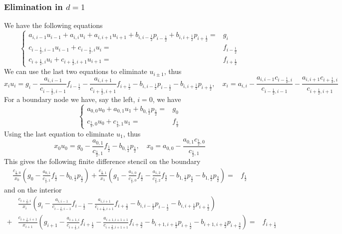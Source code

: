 \documentclass[12pt, english]{article}
\begin{document}
\subsubsection{Elimination in $d=1$}
%
We have the following equations
%
\begin{equation}\label{eq:}
%
\left\{
\begin{aligned}
a_{i,i-1} u_{i-1} + a_{i,i} u_{i} + a_{i,i+1} u_{i+1} + b_{i,i-\frac12} p_{i-\frac12}   + b_{i,i+\frac12} p_{i+\frac12} =& g_i\\
c_{i-\frac12, i-1} u_{i-1} + c_{i-\frac12, i} u_{i} =& f_{i-\frac12}\\
c_{i+\frac12, i} u_{i} + c_{i+\frac12, i+1} u_{i+1} =& f_{i+\frac12}
\end{aligned}
\right.
%
\end{equation}
%
We can use the last two equations to eliminate $u_{i\pm1}$, thus
%
\begin{equation}\label{eq:}
x_i u_i =  g_i - \frac{a_{i,i-1}}{c_{i-\frac12, i-1}}f_{i-\frac12}- \frac{a_{i,i+1}}{c_{i+\frac12, i+1}}f_{i+\frac12}
- b_{i,i-\frac12} p_{i-\frac12}   - b_{i,i+\frac12} p_{i+\frac12},\quad
x_i = a_{i,i} - \frac{a_{i,i-1}c_{i-\frac12, i}}{c_{i-\frac12, i-1}}- \frac{a_{i,i+1}c_{i+\frac12, i}}{c_{i+\frac12, i+1}}
\end{equation}
%
For a boundary node we have, say the left, $i=0$, we have
\begin{equation}\label{eq:}
%
\left\{
\begin{aligned}
a_{0,0} u_{0} + a_{0,1} u_{1} + b_{0,\frac12} p_{\frac12} =& g_0\\
c_{\frac12, 0} u_{0} + c_{\frac12, 1} u_{1} =& f_{\frac12}
\end{aligned}
\right.
%
\end{equation}
%
Using the last  equation to eliminate $u_{1}$, thus
%
\begin{equation}\label{eq:}
x_0 u_0 =  g_0 - \frac{a_{0,1}}{c_{\frac12, 1}}f_{\frac12}
  - b_{0,\frac12} p_{\frac12},\quad
x_0 = a_{0,0} -  \frac{a_{0,1}c_{\frac12, 0}}{c_{\frac12, 1}}
\end{equation}
%
This gives the following finite difference stencil on the boundary
%
%
\begin{align*}
\frac{c_{\frac12, 0}}{x_{0}} \left(g_0 - \frac{a_{0,1}}{c_{\frac12, 1}}f_{\frac12}
  - b_{0,\frac12} p_{\frac12}\right) 
  + \frac{c_{\frac12, 1}}{x_1} \left(
  g_1 - \frac{a_{1,0}}{c_{\frac12, 0}}f_{\frac12}- \frac{a_{1,2}}{c_{\frac32, 2}}f_{\frac32}
- b_{1,\frac12} p_{\frac12}   - b_{1,\frac32} p_{\frac32}
\right) =& f_{\frac12}
\end{align*}
%
and on the interior
%
\begin{align*}
&\frac{c_{i+\frac12, i}}{x_i} \left( 
g_i - \frac{a_{i,i-1}}{c_{i-\frac12, i-1}}f_{i-\frac12}- \frac{a_{i,i+1}}{c_{i+\frac12, i+1}}f_{i+\frac12}
- b_{i,i-\frac12} p_{i-\frac12}   - b_{i,i+\frac12} p_{i+\frac12}
\right)  
\\+& \frac{c_{i+\frac12, i+1}}{x_{i+1}} \left( 
g_{i+1} - \frac{a_{i+1,i}}{c_{i+\frac12, i}}f_{i+\frac12}- \frac{a_{i+1,i+1+1}}{c_{i+\frac32, i+1+1}}f_{i+\frac32}
- b_{i+1,i+\frac12} p_{i+\frac12}   - b_{i+1,i+\frac32} p_{i+\frac32}
\right) =& f_{i+\frac12}
\end{align*}
%
\end{document}

